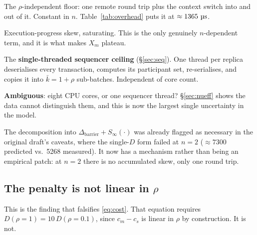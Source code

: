 \documentclass[11pt,a4paper]{article}
\newcommand{\pernode}{X_m}
\newcommand{\msecs}{\ensuremath{\,\text{\textmu}\text{s}}}
\newcommand{\nueff}{\ensuremath{\nu_{\mathrm{eff}}}}
\begin{document}
\begin{description}[leftmargin=1.4em,itemsep=3pt]
\item[$\Delta_{\mathrm{barrier}}$] The $\rho$-independent floor: one remote
      round trip plus the context switch into and out of it. Constant in $n$.
      Table~\ref{tab:overhead} puts it at $\approx\SI{1365}{\msecs}$.
\item[$S_\infty(1-e^{-n/n_0})$] Execution-progress skew, saturating. This is
      the only genuinely $n$-dependent term, and it is what makes $\pernode$
      plateau.
\item[$a+(1+\rho)b$] The \textbf{single-threaded sequencer ceiling}
      (\S\ref{sec:seq}). One thread per replica deserialises every
      transaction, computes its participant set, re-serialises, and copies it
      into $\bar{k}=1+\rho$ sub-batches. Independent of core count.
\item[$\nueff$] \textbf{Ambiguous}: eight CPU cores, or one sequencer thread?
      \S\ref{sec:nueff} shows the data cannot distinguish them, and this is
      now the largest single uncertainty in the model.
\end{description}

The decomposition into $\Delta_{\mathrm{barrier}}+S_\infty(\cdot)$ was already
flagged as necessary in the original draft's caveats, where the single-$D$ form
failed at $n{=}2$ ($\approx\num{7300}$ predicted vs.\ \num{5268} measured). It
now has a mechanism rather than being an empirical patch: at $n=2$ there is no
accumulated skew, only one round trip.

\subsection{The penalty is not linear in $\rho$}

This is the finding that falsifies \eqref{eq:cost}. That equation requires
$D(\rho{=}1) = 10\,D(\rho{=}0.1)$, since $c_m-c_s$ is linear in $\rho$ by
construction. It is not.
\end{document}
